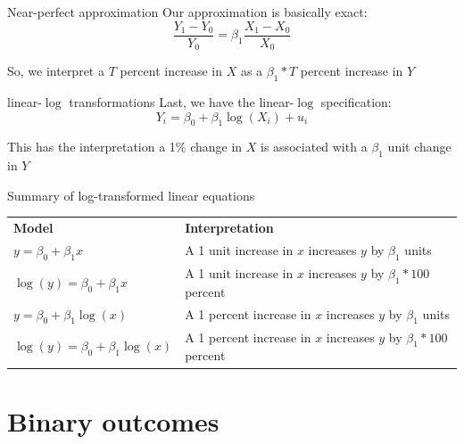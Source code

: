 \documentclass[aspectratio=169,t,11pt,table]{beamer}
\begin{document}

\begin{frame}{Near-perfect approximation}
  Our approximation is basically exact:
  $$
    \frac{Y_1 - Y_0}{Y_0} = \beta_1 \frac{X_1 - X_0}{X_0}
  $$

  \bigskip
  So, we interpret a $T$ percent increase in $X$ as a $\beta_1 * T$ percent increase in $Y$
\end{frame}
 

\begin{frame}{linear-$\log$ transformations}
  Last, we have the linear-$\log$ specification:
  $$
    Y_i = \beta_0 + \beta_1 \log(X_i) + u_i
  $$

  \bigskip
  This has the interpretation a 1\% change in $X$ is associated with a $\beta_1$ unit change in $Y$
\end{frame}

\begin{frame}{Summary of log-transformed linear equations}
  \begin{table}
    \label{tab:log_transformations}

    \begin{tabular}{@{}
      p{} p{}
    @{}}
      \toprule
      \textbf{Model} & \textbf{Interpretation} \\

      \addlinespace[1mm]
      \midrule
      \addlinespace[1mm]

      $y = \beta_0 + \beta_1 x$ & 
      A 1 unit increase in $x$ increases $y$ by $\beta_1$ units \\[\medskipamount]

      $\log(y) = \beta_0 + \beta_1 x$ & 
      A 1 unit increase in $x$ increases $y$ by $\beta_1 * 100$ percent \\[\medskipamount]

      $y = \beta_0 + \beta_1 \log(x)$ & 
      A 1 percent increase in $x$ increases $y$ by $\beta_1$ units \\[\medskipamount]

      $\log(y) = \beta_0 + \beta_1 \log(x)$ & 
      A 1 percent increase in $x$ increases $y$ by $\beta_1 * 100$ percent \\

      \bottomrule
    \end{tabular}
  \end{table}
\end{frame}


\section{Binary outcomes}
\end{document}
